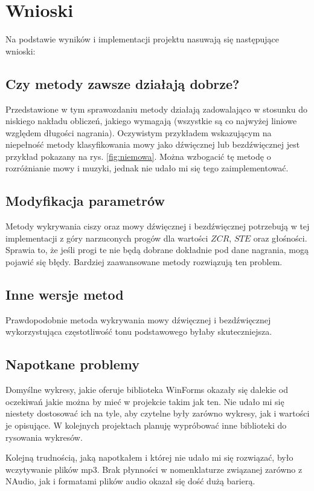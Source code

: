 \documentclass[12pt,a4paper]{article}
\begin{document}
\section{Wnioski\label{sec:wnioski}}
Na podstawie wyników i implementacji projektu nasuwają się następujące wnioski:

\subsection{Czy metody zawsze działają dobrze?\label{sec:}}
Przedstawione w tym sprawozdaniu metody działają zadowalająco w stosunku do niskiego nakładu
obliczeń, jakiego wymagają (wszystkie są co najwyżej liniowe względem długości nagrania). Oczywistym
przykładem wskazującym na niepełność metody klasyfikowania mowy jako dźwięcznej lub bezdźwięcznej
jest przykład pokazany na rys. \ref{fig:niemowa}. Można wzbogacić tę metodę o rozróżnianie mowy i
muzyki, jednak nie udało mi się tego zaimplementować.

\subsection{Modyfikacja parametrów\label{sec:modyfikacja_parametrow}}
Metody wykrywania ciszy oraz mowy dźwięcznej i bezdźwięcznej potrzebują w tej implementacji z góry
narzuconych progów dla wartości $ZCR$, $STE$ oraz głośności. Sprawia to, że jeśli progi te nie będą
dobrane dokładnie pod dane nagrania, mogą pojawić się błędy. Bardziej zaawansowane metody rozwiązują
ten problem.

\subsection{Inne wersje metod\label{sec:inne_wersje}}
Prawdopodobnie metoda wykrywania mowy dźwięcznej i bezdźwięcznej wykorzystująca częstotliwość tonu
podstawowego byłaby skuteczniejsza.

\subsection{Napotkane problemy\label{sec:problemy}}
Domyślne wykresy, jakie oferuje biblioteka WinForms okazały się dalekie od oczekiwań jakie można by
mieć w projekcie takim jak ten. Nie udało mi się niestety dostosować ich na tyle, aby czytelne były
zarówno wykresy, jak i wartości je opisujące. W kolejnych projektach planuję wypróbować inne
biblioteki do rysowania wykresów.

Kolejną trudnością, jaką napotkałem i której nie udało mi się rozwiązać, było wczytywanie plików
mp3. Brak płynności w nomenklaturze związanej zarówno z NAudio, jak i formatami plików audio okazał
się dość dużą barierą.



\end{document}
